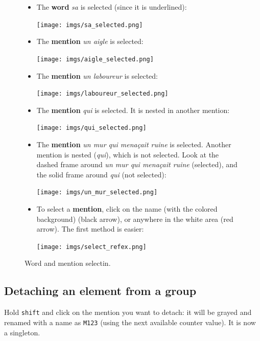 \documentclass[12pt]{article}
\begin{document}
\begin{figure}
\begin{mdframed}
\begin{itemize}
   \item The \textbf{word} \emph{sa} is selected (since it is underlined):\par
   \texttt{[image: imgs/sa\_selected.png]}
   \item The \textbf{mention} \emph{un aigle} is selected:\par
   \texttt{[image: imgs/aigle\_selected.png]}
   \item The \textbf{mention} \emph{un laboureur} is selected:\par
   \texttt{[image: imgs/laboureur\_selected.png]}
   \item The \textbf{mention} \emph{qui} is selected.  It is nested in
   another mention:\par
   \texttt{[image: imgs/qui\_selected.png]}
   \item The \textbf{mention} \emph{un mur qui menaçait ruine} is selected.
   Another mention is nested (\emph{qui}), which is not selected.  Look at
   the dashed frame around \emph{un mur qui menaçait ruine} (selected), and
   the solid frame around \emph{qui} (not selected):\par
   \texttt{[image: imgs/un\_mur\_selected.png]}
   \item To select a \textbf{mention}, click on the name (with the colored
   background) (black arrow), or anywhere in the white area (red arrow).  The
   first method is easier:\par
   \texttt{[image: imgs/select\_refex.png]}
\end{itemize}
\end{mdframed}
\caption{Word and mention selectin.}\label{fig:select-expr}
\end{figure}

 \subsection{Detaching an element from a group}

Hold \verb|shift| and click on the mention you want to detach: it will be
grayed and renamed with a name as \verb|M123| (using the next available
counter value).  It is now a singleton.

\end{document}
